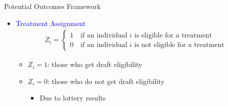 \documentclass[dvipsnames,hyperref={pdfpagelabels=false}]{beamer}
\begin{document}
\begin{frame}{Potential Outcomes Framework}
	\begin{itemize}
		
		\item \textcolor{blue}{Treatment Assignment}
		\begin{align*}
		Z_{i}=\left\lbrace
		\begin{array}{l}
		1\quad \text{if an individual $i$ is eligible for a treatment}\\
		0\quad \text{if an individual $i$ is not eligible for a treatment}
		\end{array}\right.
		\end{align*}
		\begin{itemize}
			\item $Z_{i}=1$: those who get draft eligibility 
				\vspace{0.2cm}
				\item $Z_{i}=0$: those who do not get draft eligibility 		
						\vspace{0.2cm}
					\begin{itemize}
			\item Due to lottery results
						\end{itemize}
			
		
			\vspace{0.2cm}
		\end{itemize}
		
	\end{itemize}
\end{frame}
\end{document}
